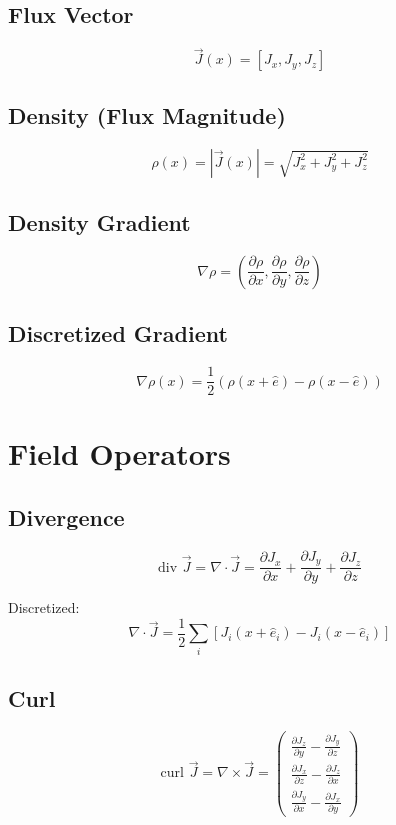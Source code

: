 \documentclass[
  11pt,
  letterpaper,
  twoside,
  openany]{book}
\makeatletter
\let\orig@section\section
\renewcommand{\section}{\needspace{8\baselineskip}\orig@section}
\let\orig@subsection\subsection
\renewcommand{\subsection}{\needspace{6\baselineskip}\orig@subsection}
\makeatother
\begin{document}
\subsection{Flux Vector}\label{flux-vector}

\[
\vec{J}(x) = [J_x, J_y, J_z]
\]

\subsection{Density (Flux Magnitude)}\label{density-flux-magnitude}

\[
\rho(x) = |\vec{J}(x)| = \sqrt{J_x^2 + J_y^2 + J_z^2}
\]

\subsection{Density Gradient}\label{density-gradient}

\[
\nabla\rho = \left(\frac{\partial\rho}{\partial x}, \frac{\partial\rho}{\partial y}, \frac{\partial\rho}{\partial z}\right)
\]

\subsection{Discretized Gradient}\label{discretized-gradient}

\[
\nabla\rho(x) = \frac{1}{2}\left(\rho(x+\hat{e}) - \rho(x-\hat{e})\right)
\]

\section{Field Operators}\label{field-operators}

\subsection{Divergence}\label{divergence}

\[
\text{div } \vec{J} = \nabla \cdot \vec{J} = \frac{\partial J_x}{\partial x} + \frac{\partial J_y}{\partial y} + \frac{\partial J_z}{\partial z}
\]

Discretized: \[
\nabla \cdot \vec{J} = \frac{1}{2}\sum_i \left[J_i(x+\hat{e}_i) - J_i(x-\hat{e}_i)\right]
\]

\subsection{Curl}\label{curl}

\[
\text{curl } \vec{J} = \nabla \times \vec{J} = \begin{pmatrix} \frac{\partial J_z}{\partial y} - \frac{\partial J_y}{\partial z} \\ \frac{\partial J_x}{\partial z} - \frac{\partial J_z}{\partial x} \\ \frac{\partial J_y}{\partial x} - \frac{\partial J_x}{\partial y} \end{pmatrix}
\]
\end{document}
